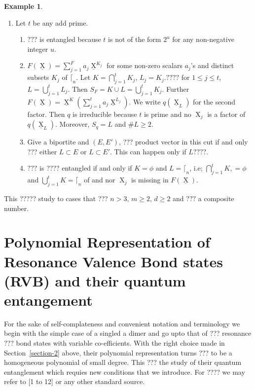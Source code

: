 \documentclass[a4paper,12pt]{article}
\DeclareMathOperator{\x}{\mathrm{X}}
\theoremstyle{definition}
\theoremstyle{underlinethm}
\newtheorem{example}{Example}[section]
\theoremstyle{underline}
\begin{document}
\begin{example}
\begin{enumerate}[label=(\roman*)]
 \item Let $t$ be any add prime.
 
 \begin{enumerate}[label=(\alph*)]
 \item $???$ is entangled because $t$ is not of the form $2^{u}$ for any non-negative integer $u$.
 \item $F(\underline{\x}) = \sum_{j=1}^{F} a_{j}\underline{\x}^{K_{j}}$ for some non-zero scalars $a_{j}$'s and distinct subsets $K_{j}$ of $\lceil_{n}$. Let $K =\bigcap\limits_{j=1}^{t} K_{j}$, $L_{j} = K_{j} . ????$ for $1 \leq j \leq t$, $L =\bigcup\limits_{j=1}^{t}L_{j}$. Then $S_{F} = K \cup L = \bigcup\limits_{j=1}^{t} K _{j}$. Further $F(\underline{\x}) = \underline{\x}^{K}(\sum_{j=1}^{t} a_{j}\underline{\x}^{L_{j}})$. We write $q(\underline{\x}_{L})$ for the second factor. Then $q$ is irreducible because $t$ is prime and no $\x_{j}$ is a factor of $q(\underline{\x}_{L})$. Moreover, $S_{q} = L$ and $\# L \geq 2$.
 \item Give a biportite  and $(E, E')$, ??? product vector in this cut if and only ??? either $L \subset E$ or $L \subset E'$. This can happen only if $L ????$.
 \item $???$ is ???? entangled if and only if $K = \phi$ and $L = \lceil_{n}$, i.e; $\bigcap\limits_{j=1}^{t} K, = \phi$ and $\bigcup\limits_{j=1}^{t} K = \lceil_{n}$ of and nor $\x_{j}$ is missing in $F(\underline{\x})$.
  \end{enumerate}
 
 \end{enumerate}
 This ????? study to cases that ??? $n > 3$, $m \geq 2$, $d \geq 2$ and $???$ a composite number.
\end{example} 

\section{Polynomial Representation of Resonance Valence Bond states (RVB) and their quantum entangement}\label{section-3}

For the sake of self-complateness and convenient notation and terminology we begin with the simple case of a singled a dimer and go upto that of ??? resonance ??? bond states with variable co-efficients. With the right choice made in Section~\ref{section-2} above, their polynomial representation turns ??? to be a homogeneous polynomial of small degree. This ??? the study of their quantum entanglement which requies new conditions that we introduce. For ???? we may refer to [1 to  12] or any other standard source.
\end{document}
